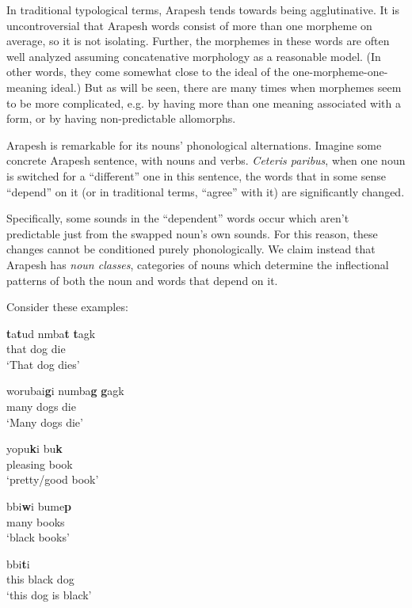 \documentclass[pdftex,12pt,letterpaper]{article}
\let\ipa\textipa
\def\sw{\ipa{\super w}}
\begin{document}
In traditional typological terms, Arapesh tends towards being agglutinative. It is uncontroversial that Arapesh words consist of more than one morpheme on average, so it is not isolating. Further, the morphemes in these words are often well analyzed assuming concatenative morphology as a reasonable model. (In other words, they come somewhat close to the ideal of the one-morpheme-one-meaning ideal.) But as will be seen, there are many times when morphemes seem to be more complicated, e.g. by having more than one meaning associated with a form, or by having non-predictable allomorphs.

Arapesh is remarkable for its nouns' phonological alternations. Imagine some concrete Arapesh sentence, with nouns and verbs. \emph{Ceteris paribus}, when one noun is switched for a ``different'' one in this sentence, the words that in some sense ``depend'' on it (or in traditional terms, ``agree'' with it) are significantly changed. 

Specifically, some sounds in the ``dependent'' words occur which aren't predictable just from the swapped noun's own sounds. For this reason, these changes cannot be conditioned purely phonologically. We claim instead that Arapesh has \emph{noun classes}, categories of nouns which determine the inflectional patterns of both the noun and words that depend on it.

Consider these examples:

\begin{exe}

\ex
\gll \textbf{t}a\textbf{t}ud n\ipa{1}mba\textbf{t} \textbf{t}agk \\
that dog die \\
\trans `That dog dies'

\ex
\gll worubai\textbf{g\sw}i numba\textbf{g\sw} \textbf{g\sw}agk \\
many dogs die \\
\trans `Many dogs die'

\ex
\gll yopu\textbf{k\sw}i bu\textbf{k\sw} \\
pleasing book\\
\trans `pretty/good book'

\ex
\gll b\ipa{@r@h@}bi\textbf{w}i bume\textbf{p} \\
many books\\
\trans `black books'

\ex
\gll \ipa{@\textbf{t}ind@} b\ipa{@r@h@}bi\textbf{t}i \ipa{n1mba\textbf{t}} \\
this black dog\\
\trans `this dog is black'

\end{exe}
\end{document}
